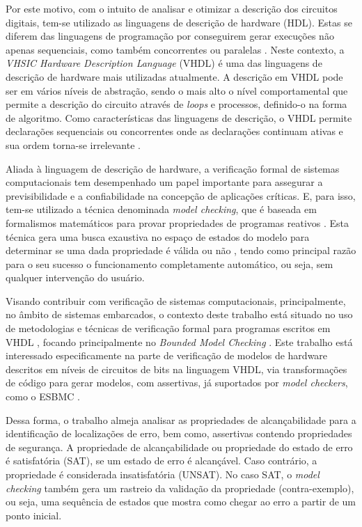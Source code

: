 \par
Por este motivo, com o intuito de analisar e otimizar a descrição dos circuitos digitais, tem-se utilizado as linguagens de descrição de hardware (HDL). Estas se diferem das linguagens de programação por conseguirem gerar execuções não apenas sequenciais, como também concorrentes ou paralelas \cite{chu2006rtl}.
% 
Neste contexto, a \textit{VHSIC Hardware Description Language} (VHDL) é uma das linguagens de descrição de hardware mais utilizadas atualmente. A descrição em VHDL pode ser em vários níveis de abstração, sendo o mais alto o nível comportamental que permite a descrição do circuito através de \textit{loops} e processos, definido-o na forma de algoritmo. Como características das linguagens de descrição, o VHDL permite declarações sequenciais ou concorrentes onde as declarações continuam ativas e sua ordem torna-se irrelevante \cite{cappelattipraticando}.

\par
Aliada à linguagem de descrição de hardware, a  verificação formal de sistemas computacionais tem desempenhado um papel importante para assegurar a previsibilidade e a confiabilidade na concepção de aplicações críticas. E, para isso, tem-se utilizado a técnica denominada \textit{model checking}, que é baseada em formalismos matemáticos para provar propriedades de programas reativos \cite{bensalem1999automatic}. Esta técnica gera uma busca exaustiva no espaço de estados do modelo para determinar se uma dada propriedade é válida ou não \cite{baier2008principles}, tendo como principal razão para o seu sucesso o funcionamento completamente automático, ou seja, sem qualquer intervenção do usuário.

\par
Visando contribuir com verificação de sistemas computacionais, principalmente, no âmbito de sistemas embarcados, o contexto deste trabalho está situado no uso de metodologias e técnicas de verificação formal para programas escritos em VHDL \cite{biere2016aiger}, focando principalmente no \textit{Bounded Model Checking} \cite{cordeiro2012smt,rocha2015model}. Este trabalho está interessado especificamente na parte de verificação de modelos de hardware descritos em níveis de circuitos de bits na linguagem VHDL, via transformações de código para gerar modelos, com assertivas, já suportados por \textit{model checkers}, como o ESBMC \cite{cordeiro2012smt}. 

\par
Dessa forma, o trabalho almeja analisar as propriedades de alcançabilidade para a identificação de localizações de erro, bem como, assertivas contendo propriedades de segurança. A propriedade de alcançabilidade ou propriedade do estado de erro é satisfatória (SAT), se um estado de erro é alcançável. Caso contrário, a propriedade é considerada insatisfatória (UNSAT). No caso SAT, o \textit{model checking} também gera um rastreio da validação da propriedade (contra-exemplo), ou seja, uma sequência de estados que mostra como chegar ao erro a partir de um ponto inicial.

